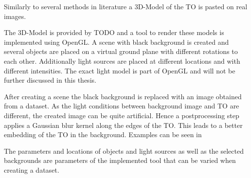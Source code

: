Similarly to several methods in literature \cite{Girshick2013, Peng, Rozantsev} a 3D-Model of the \ac{TO} is pasted on real images.

The 3D-Model is provided by TODO and a tool to render these models is implemented using OpenGL. A scene with black background is created and several objects are placed on a virtual ground plane with different rotations to each other. Additionally light sources are placed at different locations and with different intensities. The exact light model is part of OpenGL and will not be further discussed in this thesis. 

After creating a scene the black background is replaced with an image obtained from a dataset. As the light conditions between background image and \ac{TO} are different, the created image can be quite artificial. Hence a postprocessing step applies a Gaussian blur kernel along the edges of the \ac{TO}. This leads to a better embedding of the \ac{TO} in the background.
Examples can be seen in 

The parameters and locations of objects and light sources as well as the selected backgrounds are parameters of the implemented tool that can be varied when creating a dataset.

